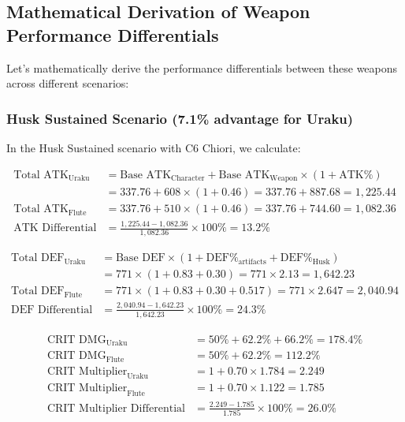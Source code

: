 \documentclass[12pt,a4paper]{article}
\begin{document}
\subsection{Mathematical Derivation of Weapon Performance Differentials}

Let's mathematically derive the performance differentials between these weapons across different scenarios:

\subsubsection{Husk Sustained Scenario (7.1\% advantage for Uraku)}

In the Husk Sustained scenario with C6 Chiori, we calculate:

\begin{align}
\text{Total ATK}_{\text{Uraku}} &= \text{Base ATK}_{\text{Character}} + \text{Base ATK}_{\text{Weapon}} \times (1 + \text{ATK\%}) \\
&= 337.76 + 608 \times (1 + 0.46) = 337.76 + 887.68 = 1,225.44 \\
\text{Total ATK}_{\text{Flute}} &= 337.76 + 510 \times (1 + 0.46) = 337.76 + 744.60 = 1,082.36 \\
\text{ATK Differential} &= \frac{1,225.44 - 1,082.36}{1,082.36} \times 100\% = 13.2\%
\end{align}

\begin{align}
\text{Total DEF}_{\text{Uraku}} &= \text{Base DEF} \times (1 + \text{DEF\%}_{\text{artifacts}} + \text{DEF\%}_{\text{Husk}}) \\
&= 771 \times (1 + 0.83 + 0.30) = 771 \times 2.13 = 1,642.23 \\
\text{Total DEF}_{\text{Flute}} &= 771 \times (1 + 0.83 + 0.30 + 0.517) = 771 \times 2.647 = 2,040.94 \\
\text{DEF Differential} &= \frac{2,040.94 - 1,642.23}{1,642.23} \times 100\% = 24.3\%
\end{align}

\begin{align}
\text{CRIT DMG}_{\text{Uraku}} &= 50\% + 62.2\% + 66.2\% = 178.4\% \\
\text{CRIT DMG}_{\text{Flute}} &= 50\% + 62.2\% = 112.2\% \\
\text{CRIT Multiplier}_{\text{Uraku}} &= 1 + 0.70 \times 1.784 = 2.249 \\
\text{CRIT Multiplier}_{\text{Flute}} &= 1 + 0.70 \times 1.122 = 1.785 \\
\text{CRIT Multiplier Differential} &= \frac{2.249 - 1.785}{1.785} \times 100\% = 26.0\%
\end{align}
\end{document}
